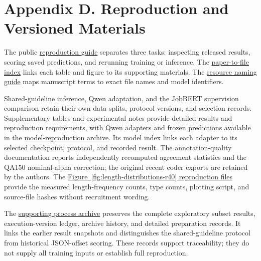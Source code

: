 \section{Appendix D. Reproduction and Versioned Materials}
\label{app:d}
\label{sec:extension-provenance}
\label{sec:display-archive-r14}

The public \href{https://github.com/AlfredJamesLi/chinese-skillspan-benchmark/blob/main/REPRODUCIBILITY.md}{reproduction guide} separates three tasks: inspecting released results, scoring saved predictions, and rerunning training or inference. The \href{https://github.com/AlfredJamesLi/chinese-skillspan-benchmark/blob/main/reproduction/PAPER_INDEX.md}{paper-to-file index} links each table and figure to its supporting materials. The \href{https://github.com/AlfredJamesLi/chinese-skillspan-benchmark/blob/main/PAPER_NAMES.md}{resource naming guide} maps manuscript terms to exact file names and model identifiers.

Shared-guideline inference, Qwen adaptation, and the JobBERT supervision comparison retain their own data splits, protocol versions, and selection records. Supplementary tables and experimental notes provide detailed results and reproduction requirements, with Qwen adapters and frozen predictions available in the \href{https://doi.org/10.5281/zenodo.22851581}{model-reproduction archive}. Its model index links each adapter to its selected checkpoint, protocol, and recorded result. The annotation-quality documentation reports independently recomputed agreement statistics and the QA150 nominal-alpha correction; the original recent coder exports are retained by the authors. The \href{https://github.com/AlfredJamesLi/chinese-skillspan-benchmark/tree/main/reproduction/benchmark_profile}{Figure~\ref{fig:length-distributions-r40} reproduction files} provide the measured length-frequency counts, type counts, plotting script, and source-file hashes without recruitment wording.

The \href{https://github.com/AlfredJamesLi/chinese-skillspan-benchmark/blob/36f009fab01b8433355cb7ef5af8fad02c6cc519/reproduction/process_archive_20260924/README.md}{supporting process archive} preserves the complete exploratory subset results, execution-version ledger, archive history, and detailed preparation records. It links the earlier result snapshots and distinguishes the shared-guideline protocol from historical JSON-offset scoring. These records support traceability; they do not supply all training inputs or establish full reproduction.

